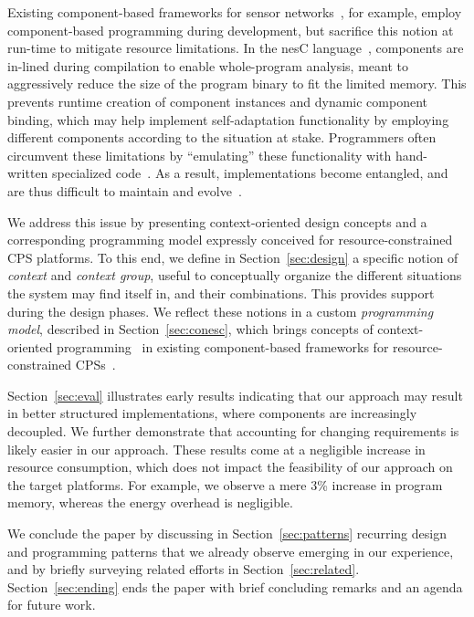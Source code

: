 Existing component-based frameworks for sensor
networks~\cite{mottola10:survey}, for example, employ component-based
programming during development, but sacrifice this notion at run-time
to mitigate resource limitations. In the nesC
language~\cite{gay03nesc}, components are in-lined during compilation
to enable whole-program analysis, meant to aggressively reduce the
size of the program binary to fit the limited memory. This prevents
runtime creation of component instances and dynamic component binding,
which may help implement self-adaptation functionality by employing
different components according to the situation at stake. Programmers
often circumvent these limitations by ``emulating'' these
functionality with hand-written specialized
code~\cite{mottola10:survey}. As a result, implementations become
entangled, and are thus difficult to maintain and
evolve~\cite{Picco:2010:SEW:1882362.1882421}.

We address this issue by presenting context-oriented design concepts
and a corresponding programming model expressly conceived for
resource-constrained CPS platforms. To this end, we define in
Section~\ref{sec:design} a specific notion of \emph{context} and
\emph{context group}, useful to conceptually organize the different
situations the system may find itself in, and their combinations. This
provides support during the design phases. We reflect these notions in
a custom \emph{programming model}, described in
Section~\ref{sec:conesc}, which brings concepts of context-oriented
programming~\cite{Hirschfeld08} in existing component-based frameworks
for resource-constrained CPSs~\cite{gay03nesc}. %

Section~\ref{sec:eval} illustrates early results indicating that our
approach may result in better structured implementations, where
components are increasingly decoupled. We further demonstrate that accounting
for changing requirements is likely easier in our approach. These
results come at a negligible increase in resource consumption, which
does not impact the feasibility of our approach on the target
platforms. For example, we observe a mere 3\% increase in program
memory, whereas the energy overhead is negligible.

We conclude the paper by discussing in Section~\ref{sec:patterns}
recurring design and programming patterns that we already observe
emerging in our experience, and by briefly surveying related efforts
in Section~\ref{sec:related}. Section~\ref{sec:ending} ends the paper
with brief concluding remarks and an agenda for future work.

